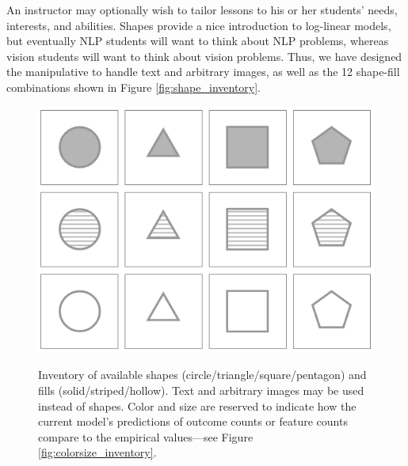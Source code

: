 \documentclass[11pt,letterpaper]{article}
\begin{document}
An instructor may optionally wish to tailor lessons to his or her
students' needs, interests, and abilities.  Shapes provide a nice
introduction to log-linear models, but eventually NLP students will
want to think about NLP problems, whereas vision students will want to
think about vision problems.  Thus, we have designed the manipulative
to handle text and arbitrary images, as well as the 12 shape-fill
combinations shown in Figure \ref{fig:shape_inventory}.

\begin{figure}[t]
\begin{center}
\centering
\includegraphics[scale=.5]{images/different_shapes_fills3x4-allgray.PNG}
\caption{Inventory of available shapes
  (circle/triangle/square/pentagon) and fills (solid/striped/hollow).
  Text and arbitrary images may be used instead of shapes.
  Color and size are reserved to indicate how the current model's predictions of outcome counts or
  feature counts compare to the empirical values---see Figure \ref{fig:colorsize_inventory}.}
\label{fig:shape_inventory}
\label{fig:inventory}
\end{center}
\end{figure}
\end{document}
